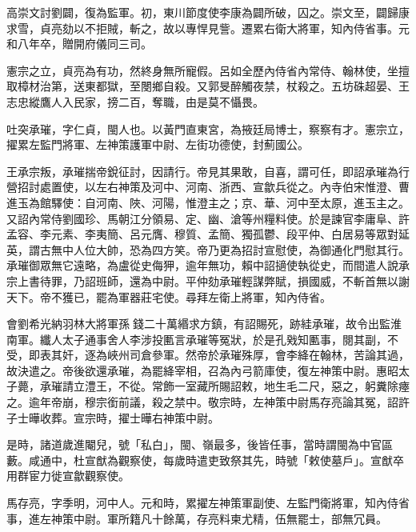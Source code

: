 \begin{pinyinscope}
 高崇文討劉闢，復為監軍。初，東川節度使李康為闢所破，囚之。崇文至，闢歸康求雪，貞亮劾以不拒賊，斬之，故以專悍見訾。遷累右衛大將軍，知內侍省事。元和八年卒，贈開府儀同三司。



 憲宗之立，貞亮為有功，然終身無所寵假。呂如全歷內侍省內常侍、翰林使，坐擅取樟材治第，送東都獄，至閿鄉自殺。又郭旻醉觸夜禁，杖殺之。五坊硃超晏、王志忠縱鷹人入民家，搒二百，奪職，由是莫不懾畏。



 吐突承璀，字仁貞，閩人也。以黃門直東宮，為掖廷局博士，察察有才。憲宗立，擢累左監門將軍、左神策護軍中尉、左街功德使，封薊國公。



 王承宗叛，承璀揣帝銳征討，因請行。帝見其果敢，自喜，謂可任，即詔承璀為行營招討處置使，以左右神策及河中、河南、浙西、宣歙兵從之。內寺伯宋惟澄、曹進玉為館驛使：自河南、陜、河陽，惟澄主之；京、華、河中至太原，進玉主之。又詔內常侍劉國珍、馬朝江分領易、定、幽、滄等州糧料使。於是諫官李庸阜、許孟容、李元素、李夷簡、呂元膺、穆質、孟簡、獨孤鬱、段平仲、白居易等眾對延英，謂古無中人位大帥，恐為四方笑。帝乃更為招討宣慰使，為御通化門慰其行。承璀御眾無它遠略，為盧從史侮狎，逾年無功，賴中詔擿使執從史，而間遣人說承宗上書待罪，乃詔班師，還為中尉。平仲劾承璀輕謀弊賦，損國威，不斬首無以謝天下。帝不獲已，罷為軍器莊宅使。尋拜左衛上將軍，知內侍省。



 會劉希光納羽林大將軍孫錢二十萬緡求方鎮，有詔賜死，跡絓承璀，故令出監淮南軍。纖人太子通事舍人李涉投匭言承璀等冤狀，於是孔戣知匭事，閱其副，不受，即表其奸，逐為峽州司倉參軍。然帝於承璀殊厚，會李絳在翰林，苦論其過，故決遣之。帝後欲還承璀，為罷絳宰相，召為內弓箭庫使，復左神策中尉。惠昭太子薨，承璀請立澧王，不從。常飾一室藏所賜詔敕，地生毛二尺，惡之，躬糞除瘞之。逾年帝崩，穆宗銜前議，殺之禁中。敬宗時，左神策中尉馬存亮論其冤，詔許子士曄收葬。宣宗時，擢士曄右神策中尉。



 是時，諸道歲進閹兒，號「私白」，閩、嶺最多，後皆任事，當時謂閩為中官區藪。咸通中，杜宣猷為觀察使，每歲時遣吏致祭其先，時號「敕使墓戶」。宣猷卒用群宦力徙宣歙觀察使。



 馬存亮，字季明，河中人。元和時，累擢左神策軍副使、左監門衛將軍，知內侍省事，進左神策中尉。軍所籍凡十餘萬，存亮料柬尤精，伍無罷士，部無冗員。




\end{pinyinscope}
